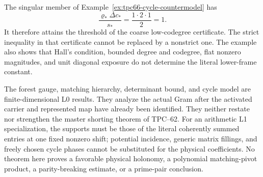 \begin{remark}
\label{rem:tpc66-cycle-sharp-boundary}
The singular member of
Example~\ref{ex:tpc66-cycle-countermodel} has
\[
 \frac{\varrho_*\Delta c_*}{s_*}
 =
 \frac{1\cdot2\cdot1}{2}=1.
\]
It therefore attains the threshold of the coarse low-codegree certificate.
The strict inequality in that certificate cannot be replaced by a
nonstrict one.  The example also shows that Hall's condition, bounded
degree and codegree, flat nonzero magnitudes, and unit diagonal exposure
do not determine the literal lower-frame constant.
\end{remark}

\begin{remark}
\label{rem:tpc66-forest-cycle-claim-level}
The forest gauge, matching hierarchy, determinant bound, and cycle model
are finite-dimensional L0 results.  They analyze the actual Gram after the
activated carrier and represented map have already been identified.  They
neither restate nor strengthen the master shorting theorem of TPC--62.
For an arithmetic L1 specialization, the supports must be those of the
literal coherently summed entries at one fixed nonzero shift; potential
incidence, generic matrix fillings, and freely chosen cycle phases cannot
be substituted for the physical coefficients.  No theorem here proves a
favorable physical holonomy, a polynomial matching-pivot product, a
parity-breaking estimate, or a prime-pair conclusion.
\end{remark}
